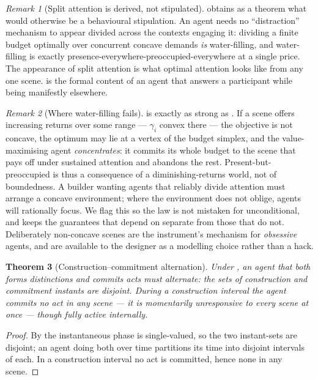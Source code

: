 \documentclass[11pt,a4paper]{article}
\theoremstyle{clstyle}
\newtheorem{theorem}{Theorem}[section]
\theoremstyle{definition}
\theoremstyle{remark}
\newtheorem{remark}[theorem]{Remark}
\begin{document}
\begin{remark}[Split attention is derived, not stipulated]
\label{rem:split}
 obtains as a theorem what would otherwise be a
behavioural stipulation. An agent needs no ``distraction'' mechanism to
appear divided across the contexts engaging it: dividing a finite budget
optimally over concurrent concave demands \emph{is} water-filling, and
water-filling is exactly presence-everywhere-preoccupied-everywhere at a
single price. The appearance of split attention is what optimal attention
looks like from any one scene.  is the formal content of an
agent that answers a participant while being manifestly elsewhere.
\end{remark}

\begin{remark}[Where water-filling fails]
\label{rem:nonconcave}
 is exactly as strong as . If a scene
offers increasing returns over some range --- $\gamma_i$ convex there --- the
objective is not concave, the optimum may lie at a vertex of the budget
simplex, and the value-maximising agent \emph{concentrates}: it commits its
whole budget to the scene that pays off under sustained attention and
abandons the rest. Present-but-preoccupied is thus a consequence of a
diminishing-returns world, not of boundedness. A builder wanting agents that
reliably divide attention must arrange a concave environment; where the
environment does not oblige, agents will rationally focus. We flag this so
the law is not mistaken for unconditional, and  keeps the
guarantees that depend on  separate from those that do not.
Deliberately non-concave scenes are the instrument's mechanism for
\emph{obsessive} agents, and are available to the designer as a modelling
choice rather than a hack.
\end{remark}

\begin{theorem}[Construction--commitment alternation]
\label{thm:alternation}
Under , an agent that both forms distinctions and commits acts
must alternate: the sets of construction and commitment instants are
disjoint. During a construction interval the agent commits no act
\emph{in any scene} --- it is momentarily unresponsive to every scene at once
--- though fully active internally.
\end{theorem}

\begin{proof}
By  the instantaneous phase is single-valued, so the two
instant-sets are disjoint; an agent doing both over time partitions its time
into disjoint intervals of each. In a construction interval no act is
committed, hence none in any scene.
\end{proof}
\end{document}
